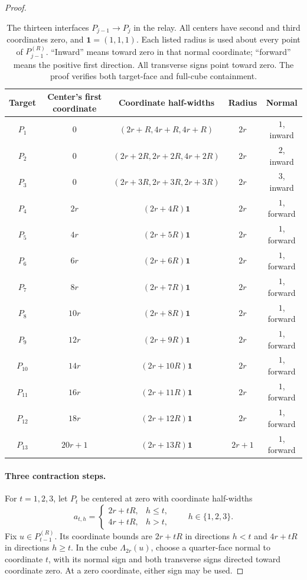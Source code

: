 \documentclass[11pt]{article}
\theoremstyle{definition}
\theoremstyle{remark}
\numberwithin{equation}{section}
\begin{document}
\begin{proof}
\begin{table}[tbp]
\centering
\small
\begin{tabular}{c c c c c}
\hline
Target & Center's first coordinate & Coordinate half-widths & Radius & Normal\\
\hline
$P_1$ & $0$ & $(2r+R,4r+R,4r+R)$ & $2r$ & $1$, inward\\
$P_2$ & $0$ & $(2r+2R,2r+2R,4r+2R)$ & $2r$ & $2$, inward\\
$P_3$ & $0$ & $(2r+3R,2r+3R,2r+3R)$ & $2r$ & $3$, inward\\
$P_4$ & $2r$ & $(2r+4R)\mathbf1$ & $2r$ & $1$, forward\\
$P_5$ & $4r$ & $(2r+5R)\mathbf1$ & $2r$ & $1$, forward\\
$P_6$ & $6r$ & $(2r+6R)\mathbf1$ & $2r$ & $1$, forward\\
$P_7$ & $8r$ & $(2r+7R)\mathbf1$ & $2r$ & $1$, forward\\
$P_8$ & $10r$ & $(2r+8R)\mathbf1$ & $2r$ & $1$, forward\\
$P_9$ & $12r$ & $(2r+9R)\mathbf1$ & $2r$ & $1$, forward\\
$P_{10}$ & $14r$ & $(2r+10R)\mathbf1$ & $2r$ & $1$, forward\\
$P_{11}$ & $16r$ & $(2r+11R)\mathbf1$ & $2r$ & $1$, forward\\
$P_{12}$ & $18r$ & $(2r+12R)\mathbf1$ & $2r$ & $1$, forward\\
$P_{13}$ & $20r+1$ & $(2r+13R)\mathbf1$ & $2r+1$ & $1$, forward\\
\hline
\end{tabular}
\caption{The thirteen interfaces $P_{j-1}\to P_j$ in the relay.
All centers have second and third coordinates zero, and
$\mathbf1=(1,1,1)$. Each listed radius is used about every point
of $P_{j-1}^{(R)}$. ``Inward'' means toward zero in that normal coordinate;
``forward'' means the positive first direction. All transverse signs point
toward zero. The proof verifies both target-face and full-cube containment.}
\label{geom:interfaces}
\end{table}

\paragraph{Three contraction steps.}
For $t=1,2,3$, let $P_t$ be centered at zero with coordinate half-widths
\begin{equation}\label{geom:contraction-widths}
  a_{t,h}=\begin{cases}
    2r+tR,&h\le t,\\
    4r+tR,&h>t,
  \end{cases}
  \qquad h\in\{1,2,3\}.
\end{equation}
Fix $u\in P_{t-1}^{(R)}$. Its coordinate bounds are $2r+tR$ in directions
$h<t$ and $4r+tR$ in directions $h\ge t$. In the cube $\Lambda_{2r}(u)$,
choose a quarter-face normal to coordinate $t$, with its normal sign and both
transverse signs directed toward coordinate zero. At a zero coordinate,
either sign may be used.


\end{proof}
\end{document}
